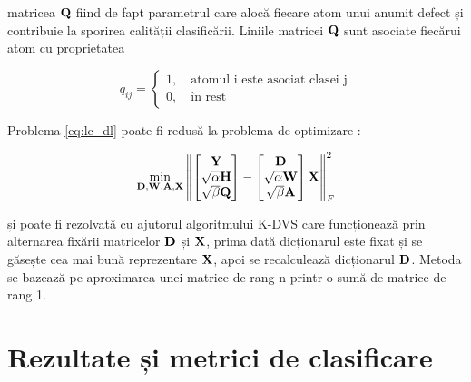matricea $\mathbf{Q}$ fiind de fapt parametrul care alocă fiecare atom unui anumit defect și contribuie la sporirea calității clasificării. Liniile matricei $\mathbf{Q}$ sunt asociate fiecărui atom cu proprietatea

\begin{equation}
    q_{ij} = \begin{cases}
    1,\quad \text{atomul i este asociat clasei j} \\
    0,\quad  \text{în rest}
    \end{cases}
\end{equation}

Problema \eqref{eq:lc_dl} poate fi redusă la problema de optimizare \cite{DL_book}:

\begin{equation}
    \min_{\mathbf{D}, \mathbf{W}, \mathbf{A}, \mathbf{X}} 
    \left\lVert
    \begin{bmatrix}
    \mathbf{Y} \\
    \sqrt{\alpha} \mathbf{H} \\
    \sqrt{\beta} \mathbf{Q}
    \end{bmatrix}
    -
     \begin{bmatrix}
    \mathbf{D} \\
    \sqrt{\alpha} \mathbf{W}\\
    \sqrt{\beta} \mathbf{A}
    \end{bmatrix} 
    \mathbf{X}
    \right\rVert^2_F
    \label{eq:lc_dl}
\end{equation}

și poate fi rezolvată cu ajutorul algoritmului K-DVS care funcționează prin alternarea fixării matricelor $\mathbf{D}$ și $\mathbf{X}$, prima dată dicționarul este fixat și se găsește cea mai bună reprezentare $\mathbf{X}$, apoi se recalculează dicționarul $\mathbf{D}$. Metoda se bazează pe aproximarea unei matrice de rang n printr-o sumă de matrice de rang 1.





\section{Rezultate și metrici de clasificare}

